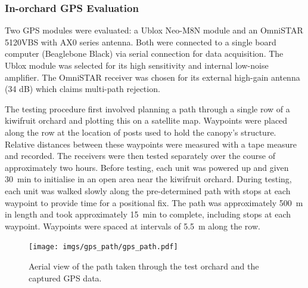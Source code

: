 \documentclass[preprint,authoryear,12pt]{elsarticle}
\begin{document}

    \subsubsection{In-orchard GPS Evaluation}
        Two GPS modules were evaluated: a Ublox Neo-M8N module and an OmniSTAR 5120VBS with AX0 series antenna.
    	Both were connected to a single board computer (Beaglebone Black) via serial connection for data acquisition.
        The Ublox module was selected for its high sensitivity and internal low-noise amplifier.
        The OmniSTAR receiver was chosen for its external high-gain antenna (34 dB) which claims multi-path rejection.

        The testing procedure first involved planning a path through a single row of a kiwifruit orchard and plotting this on a satellite map.
        Waypoints were placed along the row at the location of posts used to hold the canopy's structure.
        Relative distances between these waypoints were measured with a tape measure and recorded.
        The receivers were then tested separately over the course of approximately two hours.
        Before testing, each unit was powered up and given \SI{30}{\minute} to initialise in an open area near the kiwifruit orchard.
        During testing, each unit was walked slowly along the pre-determined path with stops at each waypoint to provide time for a positional fix.
        The path was approximately \SI{500}{\meter} in length and took approximately \SI{15}{\minute} to complete, including stops at each waypoint.
        Waypoints were spaced at intervals of \SI{5.5}{\meter} along the row.

        \begin{figure}[htb]
            \centering
            \texttt{[image: imgs/gps\_path/gps\_path.pdf]}
            \caption{
                Aerial view of the path taken through the test orchard and the captured GPS data.
            }
            \label{fig:gpsResults}
        \end{figure}
\end{document}

